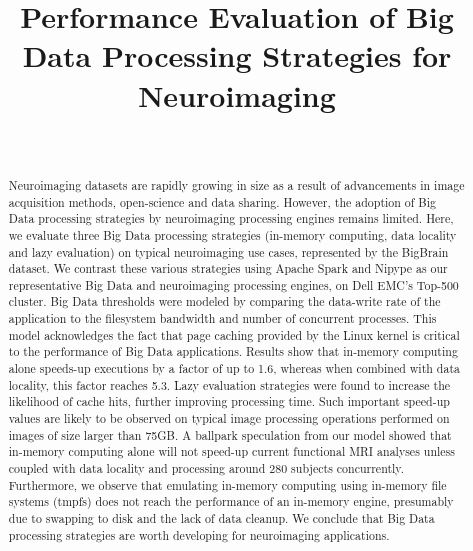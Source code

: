 \documentclass{IEEEtran}
\begin{document}
\title{Performance Evaluation of Big Data Processing Strategies for Neuroimaging}

\author{
  \\
}

\maketitle

\begin{abstract}
    Neuroimaging datasets are rapidly growing in size as a result of 
    advancements in image acquisition methods, open-science and data sharing. 
    However, the adoption of Big Data processing strategies by neuroimaging
    processing engines remains limited. Here, we 
    evaluate three Big Data processing strategies (in-memory computing, 
    data locality and lazy evaluation) on typical neuroimaging use 
    cases, represented by the BigBrain dataset. We contrast these various 
    strategies using Apache Spark and Nipype as our 
    representative Big Data and neuroimaging processing engines, on Dell EMC's 
    Top-500 cluster. 
    Big Data thresholds were modeled by comparing the data-write rate of the 
    application to the filesystem bandwidth and number of concurrent processes. 
    This model acknowledges the 
fact that page caching provided by the Linux kernel is critical to the 
performance of Big Data applications. Results show that in-memory 
computing alone speeds-up executions by a factor of up to 1.6, whereas 
when combined with data locality, this factor reaches 5.3. Lazy evaluation
strategies
were found to increase the likelihood of cache hits, further improving
    processing time. Such important 
speed-up values are likely to be observed on typical image processing 
operations performed on images of size larger than 75GB. A ballpark 
speculation from our model showed that in-memory computing alone will
not speed-up current 
functional MRI analyses unless coupled with data 
locality and processing around 280 subjects concurrently. Furthermore, we observe
    that emulating in-memory computing 
using in-memory file systems (tmpfs) does not reach the performance of an in-memory engine,
    presumably due to swapping to disk and the lack of data cleanup.
We conclude that Big Data processing strategies are 
worth developing for neuroimaging 
applications. 
\end{abstract}
\end{document}
